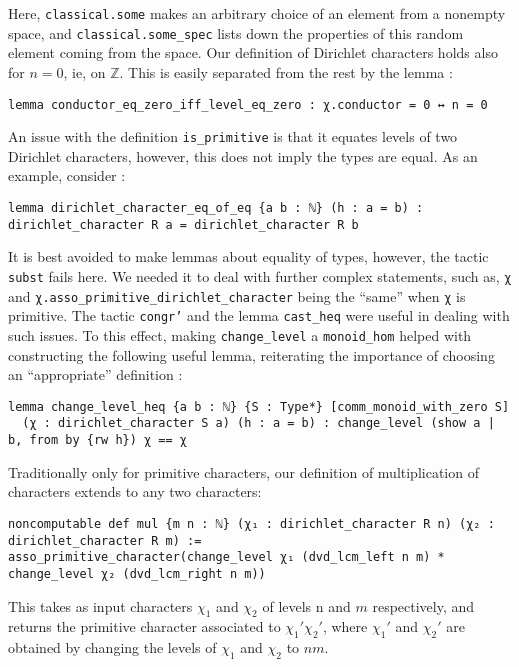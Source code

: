 \documentclass[a4paper,UKenglish,cleveref, autoref, thm-restate]{lipics-v2021}
\newcommand{\lean}[1]{\texttt{#1}\xspace} %
\begin{document}
Here, \lean{classical.some} makes an arbitrary choice of an element from a nonempty space, and \lean{classical.some\_spec} lists down the properties of this random element
coming from the space. 
Our definition of Dirichlet characters holds also for $n = 0$, ie, on $\mathbb{Z}$. 
This is easily separated from the rest by the lemma : 
\begin{lstlisting}
lemma conductor_eq_zero_iff_level_eq_zero : χ.conductor = 0 ↔ n = 0
\end{lstlisting}
An issue with the definition \lean{is\_primitive} is that it equates levels of two Dirichlet characters, 
however, this does not imply the types are equal. As an example, consider :
\begin{lstlisting}
lemma dirichlet_character_eq_of_eq {a b : ℕ} (h : a = b) :
dirichlet_character R a = dirichlet_character R b
\end{lstlisting}
It is best avoided to make lemmas about equality of types, however, the tactic \lean{subst} fails here. 
We needed it to deal with further complex statements, such as, \lean{χ} and \lean{χ.asso\_primitive\_dirichlet\_character} 
being the ``same'' when \lean{χ} is primitive. The tactic \lean{congr'} and the lemma \lean{cast\_heq} were useful in 
dealing with such issues. To this effect, making \lean{change\_level} a \lean{monoid\_hom} helped with constructing the 
following useful lemma, reiterating the importance of choosing an ``appropriate'' definition : 
\begin{lstlisting}
lemma change_level_heq {a b : ℕ} {S : Type*} [comm_monoid_with_zero S] 
  (χ : dirichlet_character S a) (h : a = b) : change_level (show a | b, from by {rw h}) χ == χ
\end{lstlisting}
Traditionally only for primitive characters, our definition of multiplication of characters 
extends to any two characters: 
\begin{lstlisting}
noncomputable def mul {m n : ℕ} (χ₁ : dirichlet_character R n) (χ₂ : dirichlet_character R m) :=
asso_primitive_character(change_level χ₁ (dvd_lcm_left n m) * change_level χ₂ (dvd_lcm_right n m))
\end{lstlisting}
This takes as input characters $\chi_1$ and $\chi_2$ of levels n and $m$ respectively, and returns the primitive 
character associated to $\chi_1' \chi_2'$, where $\chi_1'$ and $\chi_2'$ are obtained by changing the levels 
of $\chi_1$ and $\chi_2$ to $n m$. 
\end{document}
